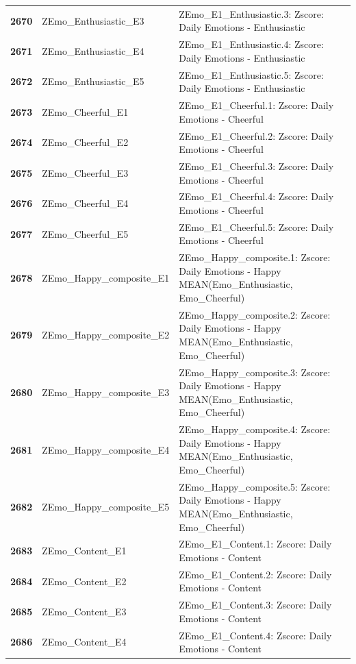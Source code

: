 \documentclass[
  letterpaper,
  DIV=11,
  numbers=noendperiod]{scrartcl}
\begin{document}
\begin{longtable}[t]{>{}cll}
\textbf{2670} & ZEmo\_Enthusiastic\_E3 & ZEmo\_E1\_Enthusiastic.3: Zscore:  Daily Emotions - Enthusiastic\\
\addlinespace
\textbf{2671} & ZEmo\_Enthusiastic\_E4 & ZEmo\_E1\_Enthusiastic.4: Zscore:  Daily Emotions - Enthusiastic\\
\textbf{2672} & ZEmo\_Enthusiastic\_E5 & ZEmo\_E1\_Enthusiastic.5: Zscore:  Daily Emotions - Enthusiastic\\
\textbf{2673} & ZEmo\_Cheerful\_E1 & ZEmo\_E1\_Cheerful.1: Zscore:  Daily Emotions - Cheerful\\
\textbf{2674} & ZEmo\_Cheerful\_E2 & ZEmo\_E1\_Cheerful.2: Zscore:  Daily Emotions - Cheerful\\
\textbf{2675} & ZEmo\_Cheerful\_E3 & ZEmo\_E1\_Cheerful.3: Zscore:  Daily Emotions - Cheerful\\
\addlinespace
\textbf{2676} & ZEmo\_Cheerful\_E4 & ZEmo\_E1\_Cheerful.4: Zscore:  Daily Emotions - Cheerful\\
\textbf{2677} & ZEmo\_Cheerful\_E5 & ZEmo\_E1\_Cheerful.5: Zscore:  Daily Emotions - Cheerful\\
\textbf{2678} & ZEmo\_Happy\_composite\_E1 & ZEmo\_Happy\_composite.1: Zscore:  Daily Emotions - Happy MEAN(Emo\_Enthusiastic, Emo\_Cheerful)\\
\textbf{2679} & ZEmo\_Happy\_composite\_E2 & ZEmo\_Happy\_composite.2: Zscore:  Daily Emotions - Happy MEAN(Emo\_Enthusiastic, Emo\_Cheerful)\\
\textbf{2680} & ZEmo\_Happy\_composite\_E3 & ZEmo\_Happy\_composite.3: Zscore:  Daily Emotions - Happy MEAN(Emo\_Enthusiastic, Emo\_Cheerful)\\
\addlinespace
\textbf{2681} & ZEmo\_Happy\_composite\_E4 & ZEmo\_Happy\_composite.4: Zscore:  Daily Emotions - Happy MEAN(Emo\_Enthusiastic, Emo\_Cheerful)\\
\textbf{2682} & ZEmo\_Happy\_composite\_E5 & ZEmo\_Happy\_composite.5: Zscore:  Daily Emotions - Happy MEAN(Emo\_Enthusiastic, Emo\_Cheerful)\\
\textbf{2683} & ZEmo\_Content\_E1 & ZEmo\_E1\_Content.1: Zscore:  Daily Emotions - Content\\
\textbf{2684} & ZEmo\_Content\_E2 & ZEmo\_E1\_Content.2: Zscore:  Daily Emotions - Content\\
\textbf{2685} & ZEmo\_Content\_E3 & ZEmo\_E1\_Content.3: Zscore:  Daily Emotions - Content\\
\addlinespace
\textbf{2686} & ZEmo\_Content\_E4 & ZEmo\_E1\_Content.4: Zscore:  Daily Emotions - Content\\

\end{longtable}
\end{document}
